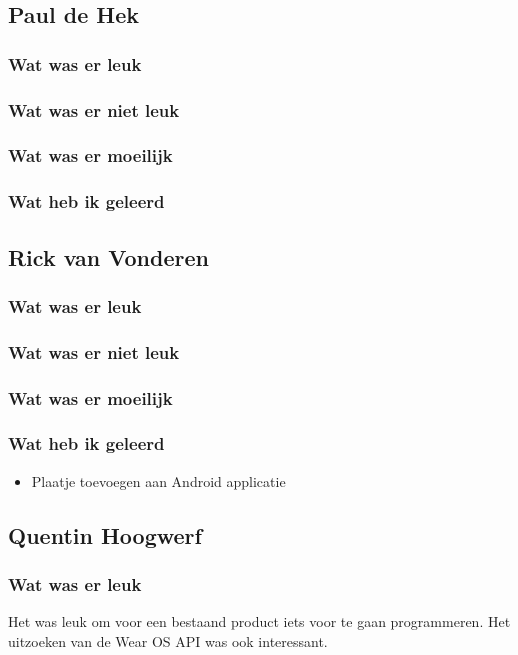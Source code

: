\documentclass[../main.tex]{subfiles}
\begin{document}
\subsection{Paul de Hek}
\subsubsection{Wat was er leuk}
\subsubsection{Wat was er niet leuk}
\subsubsection{Wat was er moeilijk}
\subsubsection{Wat heb ik geleerd}
\newpage

\subsection{Rick van Vonderen}
\subsubsection{Wat was er leuk}
\subsubsection{Wat was er niet leuk}
\subsubsection{Wat was er moeilijk}
\subsubsection{Wat heb ik geleerd}
\begin{itemize}
	\item Plaatje toevoegen aan Android applicatie
\end{itemize}
\newpage

\subsection{Quentin Hoogwerf}
\subsubsection{Wat was er leuk}
Het was leuk om voor een bestaand product iets voor te gaan programmeren. Het uitzoeken van de
Wear OS API was ook interessant.
\end{document}
